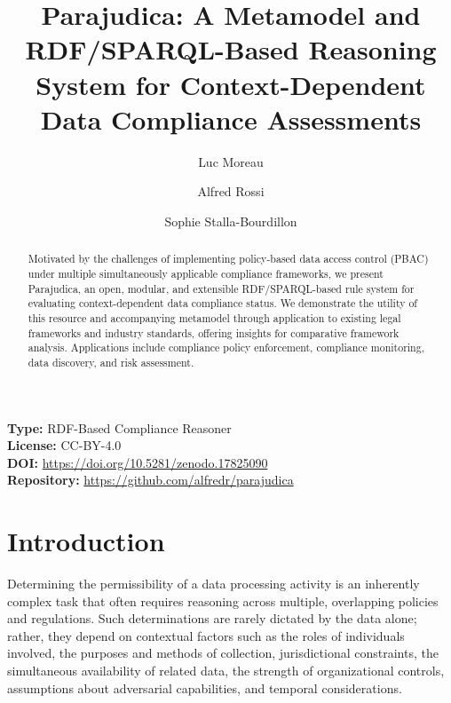 \documentclass[runningheads,oneside]{llncs}
\begin{document}
\title{Parajudica: A Metamodel and RDF/SPARQL-Based Reasoning System for Context-Dependent Data Compliance Assessments}

\author{Luc Moreau \and Alfred Rossi \and Sophie Stalla-Bourdillon}


\maketitle

\begin{abstract}
Motivated by the challenges of implementing policy-based data access control (PBAC) under multiple simultaneously applicable compliance frameworks, we present Parajudica, an open, modular, and extensible RDF/SPARQL-based rule system for evaluating context-dependent data compliance status. We demonstrate the utility of this resource and accompanying metamodel through application to existing legal frameworks and industry standards, offering insights for comparative framework analysis. Applications include compliance policy enforcement, compliance monitoring, data discovery, and risk assessment.

\end{abstract}

\medskip
\noindent\textbf{Type:} RDF-Based Compliance Reasoner\\
\textbf{License:} CC-BY-4.0\\
\textbf{DOI:} \url{https://doi.org/10.5281/zenodo.17825090}\\
\textbf{Repository:} \url{https://github.com/alfredr/parajudica}

\section{Introduction}\label{sec:introduction}


Determining the permissibility of a data processing activity is an inherently complex task that often requires reasoning across multiple, overlapping policies and regulations. Such determinations are rarely dictated by the data alone; rather, they depend on contextual factors such as the roles of individuals involved, the purposes and methods of collection, jurisdictional constraints, the simultaneous availability of related data, the strength of organizational controls, assumptions about adversarial capabilities, and temporal considerations.
\end{document}
